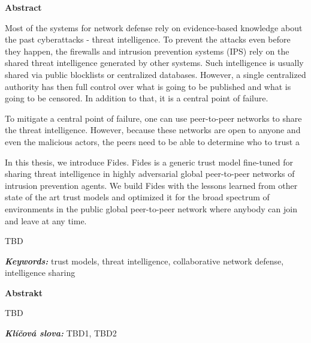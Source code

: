 \newenvironment{abstractpage}
  {\cleardoublepage\thispagestyle{empty}}
  {\vfill\cleardoublepage}
\newenvironment{abstract}[1]
  {\bigskip
   \begin{center}\bfseries#1\end{center}\small\leftskip=0.5cm\rightskip=0.5cm}
  {\par\bigskip}

\providecommand{\keywords}[2]{\footnotesize\textbf{\textit{#1:}} #2}

\begin{abstractpage}
\begin{abstract}{Abstract}

Most of the systems for network defense rely on evidence-based knowledge about the past cyberattacks - threat intelligence. To prevent the attacks even before they happen, the firewalls and intrusion prevention systems (IPS) rely on the shared threat intelligence generated by other systems.
Such intelligence is usually shared via public blocklists or centralized databases. 
However, a single centralized authority has then full control over what is going to be published and what is going to be censored. In addition to that, it is a central point of failure.

To mitigate a central point of failure, one can use peer-to-peer networks to share the threat intelligence. However, because these networks are open to anyone and even the malicious actors, the peers need to be able to determine who to trust a

In this thesis, we introduce Fides. Fides is a generic trust model fine-tuned for sharing threat intelligence in highly adversarial global peer-to-peer networks of intrusion prevention agents.
We build Fides with the lessons learned from other state of the art trust models and optimized it for the broad spectrum of environments in the public global peer-to-peer network where anybody can join and leave at any time.



%  
TBD 
\end{abstract}

\keywords{Keywords}{trust models, threat intelligence, collaborative network defense, intelligence sharing}

\vspace*{\fill}

\begin{abstract}{Abstrakt}
    TBD 
    
\end{abstract}
\keywords{Klíčová slova}{TBD1, TBD2} 

\end{abstractpage}
\thispagestyle{empty}

\cleardoublepage